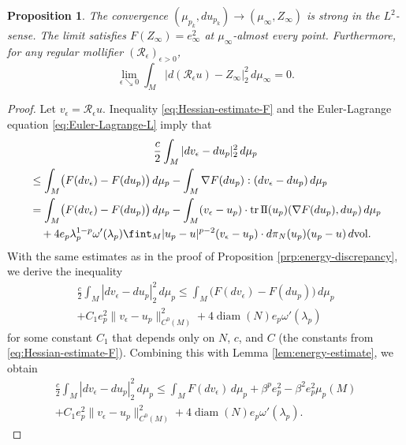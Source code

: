 \documentclass[a4paper]{article}
\newcommand{\vol}{\mathrm{vol}}
\newcommand{\sff}{\mathrm{I{\mkern -1mu}I}}
\DeclareMathOperator{\tr}{tr}
\DeclareMathOperator{\diam}{diam}
\newtheorem{proposition}[theorem]{Proposition}
\theoremstyle{definition}
\theoremstyle{remark}
\begin{document}
\begin{proposition} \label{prp:strong-convergence}
The convergence $(\mu_{p_k}, du_{p_k}) \to (\mu_\infty, Z_\infty)$ is strong in the $L^2$- sense. The limit satisfies $F(Z_\infty) = e_\infty^2$ at $\mu_\infty$-almost every point. Furthermore, for any regular mollifier $(\mathcal{R}_\epsilon)_{\epsilon > 0}$,
\[
\lim_{\epsilon \searrow 0} \int_M |d(\mathcal{R}_\epsilon u) - Z_\infty|_2^2 \, d\mu_\infty = 0.
\]
\end{proposition}

\begin{proof}
Let $v_\epsilon = \mathcal{R}_\epsilon u$. Inequality \eqref{eq:Hessian-estimate-F} and the Euler-Lagrange equation \eqref{eq:Euler-Lagrange-L} imply that
\begin{multline*}
\frac{c}{2} \int_M |dv_\epsilon - du_p|_2^2 \, d\mu_p \\
\begin{aligned}
& \le \int_M \bigl(F(dv_\epsilon) - F(du_p)\bigr) \, d\mu_p - \int_M \nabla F(du_p) : (dv_\epsilon - du_p) \, d\mu_p \\
& = \int_M \bigl(F(dv_\epsilon) - F(du_p)\bigr) \, d\mu_p - \int_M (v_\epsilon - u_p) \cdot \tr \sff(u_p)(\nabla F(du_p), du_p) \, d\mu_p \\
& \quad + 4 e_p \lambda_p^{1 - p} \omega'(\lambda_p) \fint_M |u_p - u|^{p - 2} (v_\epsilon - u_p) \cdot d\pi_N(u_p)(u_p - u) \, d\vol.
\end{aligned}
\end{multline*}
With the same estimates as in the proof of Proposition \ref{prp:energy-discrepancy},
we derive the inequality
\begin{multline*}
\frac{c}{2} \int_M |dv_\epsilon - du_p|_2^2 \, d\mu_p \le \int_M \bigl(F(dv_\epsilon) - F(du_p)\bigr) \, d\mu_p \\
+ C_1 e_p^2 \|v_\epsilon - u_p\|_{C^0(M)}^2 + 4\diam(N) e_p \omega'(\lambda_p)
\end{multline*}
for some constant $C_1$ that depends only on $N$, $c$, and $C$ (the constants from \eqref{eq:Hessian-estimate-F}).
Combining this with Lemma \ref{lem:energy-estimate}, we obtain
\begin{multline*}
\frac{c}{2} \int_M |dv_\epsilon - du_p|_2^2 \, d\mu_p \le \int_M F(dv_\epsilon) \, d\mu_p + \beta^p e_p^2 - \beta^2 e_p^2 \mu_p(M) \\
+ C_1 e_p^2 \|v_\epsilon - u_p\|_{C^0(M)}^2 + 4 \diam(N) e_p \omega'(\lambda_p).
\end{multline*}


\end{proof}
\end{document}
